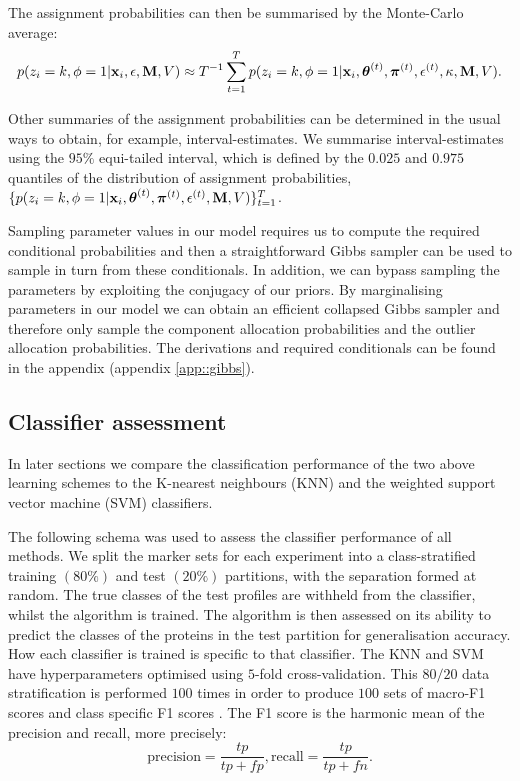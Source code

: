 \documentclass[12pt,english]{article}\usepackage[]{graphicx}\usepackage[]{color}
\begin{document}
The assignment probabilities can then be summarised by the
Monte-Carlo average:
\[p(z_i = k, \phi = 1 | {\bf x}_i, \epsilon, {\bf M}, V) \approx T^{-1}\sum_{t=1}^{T}p(z_i = k, \phi = 1 | {\bf x}_i, \boldsymbol{\theta}^{(t)}, \boldsymbol{\pi}^{(t)} , \epsilon^{(t)}, \kappa, {\bf M}, V).\]

Other summaries of the assignment probabilities
can be determined in the usual ways to obtain, for example,
interval-estimates. We summarise interval-estimates using the $95\%$ equi-tailed interval, which is defined by the $0.025$ and $0.975$ quantiles of the distribution of assignment probabilities, $\{p(z_i = k, \phi = 1 | {\bf x}_i, \boldsymbol{\theta}^{(t)}, \boldsymbol{\pi}^{(t)} , \epsilon^{(t)}, {\bf M}, V) \}_{t=1}^T$.

Sampling parameter values in our model requires us to compute the required conditional probabilities
and then a straightforward Gibbs sampler can be used to sample in turn from these conditionals. In addition,
we can bypass sampling the parameters by exploiting the conjugacy of our priors. By marginalising parameters
in our model we can obtain an efficient collapsed Gibbs sampler and therefore only sample the component allocation
probabilities and the outlier allocation probabilities. The derivations and required conditionals
can be found in the appendix (appendix \ref{app::gibbs}).

\subsection{Classifier assessment}\label{section::assessment}
In later sections we compare the classification performance of
the two above learning schemes to the K-nearest
neighbours (KNN) and the weighted support vector machine
(SVM) classifiers.

The following schema was used to assess the classifier
performance of all methods. We split the marker sets for each
experiment into a class-stratified training $(80\%)$ and test $(20\%)$
partitions, with the separation formed at random. The true classes of
the test profiles are withheld from the classifier, whilst the
algorithm is trained. The algorithm is
then assessed on its ability to predict the classes of the proteins in the
test partition for generalisation accuracy. How each classifier is trained is
specific to that classifier.
The KNN and SVM have hyperparameters optimised using $5$-fold
cross-validation. This $80/20$ data stratification is performed $100$
times in order to produce $100$ sets of macro-F1
\citep{He::2009} scores and class specific F1 scores \citep{Breckels:2016}. The F1
score is the harmonic mean of the precision and recall, more
precisely:
\[\text{precision}=\frac{tp}{tp+fp}, \text{recall} = \frac{tp}{tp+fn}.\]
\end{document}

